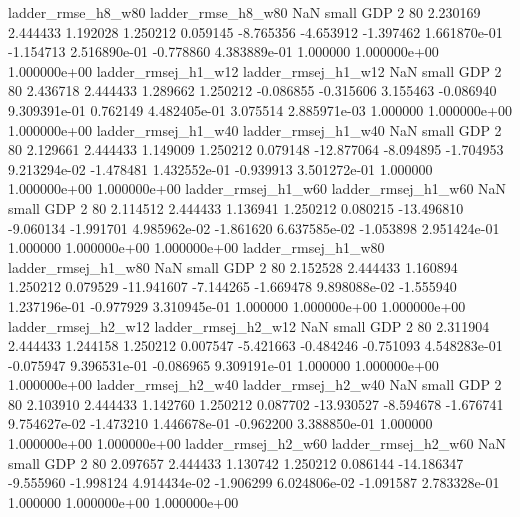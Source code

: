       ladder_rmse_h8_w80       ladder_rmse_h8_w80                   NaN      small      GDP                 2 80 2.230169       2.444433 1.192028       1.250212    0.059145     -8.765356     -4.653912    -1.397462   1.661870e-01 -1.154713 2.516890e-01    -0.778860   4.383889e-01            1.000000    1.000000e+00        1.000000e+00
     ladder_rmsej_h1_w12      ladder_rmsej_h1_w12                   NaN      small      GDP                 2 80 2.436718       2.444433 1.289662       1.250212   -0.086855     -0.315606      3.155463    -0.086940   9.309391e-01  0.762149 4.482405e-01     3.075514   2.885971e-03            1.000000    1.000000e+00        1.000000e+00
     ladder_rmsej_h1_w40      ladder_rmsej_h1_w40                   NaN      small      GDP                 2 80 2.129661       2.444433 1.149009       1.250212    0.079148    -12.877064     -8.094895    -1.704953   9.213294e-02 -1.478481 1.432552e-01    -0.939913   3.501272e-01            1.000000    1.000000e+00        1.000000e+00
     ladder_rmsej_h1_w60      ladder_rmsej_h1_w60                   NaN      small      GDP                 2 80 2.114512       2.444433 1.136941       1.250212    0.080215    -13.496810     -9.060134    -1.991701   4.985962e-02 -1.861620 6.637585e-02    -1.053898   2.951424e-01            1.000000    1.000000e+00        1.000000e+00
     ladder_rmsej_h1_w80      ladder_rmsej_h1_w80                   NaN      small      GDP                 2 80 2.152528       2.444433 1.160894       1.250212    0.079529    -11.941607     -7.144265    -1.669478   9.898088e-02 -1.555940 1.237196e-01    -0.977929   3.310945e-01            1.000000    1.000000e+00        1.000000e+00
     ladder_rmsej_h2_w12      ladder_rmsej_h2_w12                   NaN      small      GDP                 2 80 2.311904       2.444433 1.244158       1.250212    0.007547     -5.421663     -0.484246    -0.751093   4.548283e-01 -0.075947 9.396531e-01    -0.086965   9.309191e-01            1.000000    1.000000e+00        1.000000e+00
     ladder_rmsej_h2_w40      ladder_rmsej_h2_w40                   NaN      small      GDP                 2 80 2.103910       2.444433 1.142760       1.250212    0.087702    -13.930527     -8.594678    -1.676741   9.754627e-02 -1.473210 1.446678e-01    -0.962200   3.388850e-01            1.000000    1.000000e+00        1.000000e+00
     ladder_rmsej_h2_w60      ladder_rmsej_h2_w60                   NaN      small      GDP                 2 80 2.097657       2.444433 1.130742       1.250212    0.086144    -14.186347     -9.555960    -1.998124   4.914434e-02 -1.906299 6.024806e-02    -1.091587   2.783328e-01            1.000000    1.000000e+00        1.000000e+00
